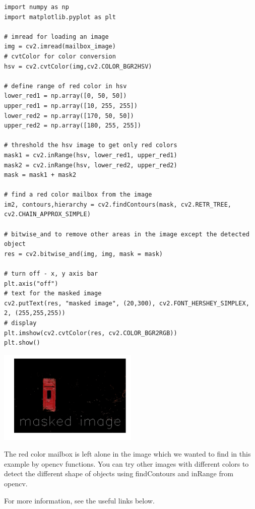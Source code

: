 \begin{lstlisting}
import numpy as np
import matplotlib.pyplot as plt

# imread for loading an image
img = cv2.imread(mailbox_image)
# cvtColor for color conversion
hsv = cv2.cvtColor(img,cv2.COLOR_BGR2HSV)

# define range of red color in hsv
lower_red1 = np.array([0, 50, 50])
upper_red1 = np.array([10, 255, 255])
lower_red2 = np.array([170, 50, 50])
upper_red2 = np.array([180, 255, 255])

# threshold the hsv image to get only red colors
mask1 = cv2.inRange(hsv, lower_red1, upper_red1)
mask2 = cv2.inRange(hsv, lower_red2, upper_red2)
mask = mask1 + mask2

# find a red color mailbox from the image
im2, contours,hierarchy = cv2.findContours(mask, cv2.RETR_TREE, cv2.CHAIN_APPROX_SIMPLE)

# bitwise_and to remove other areas in the image except the detected object
res = cv2.bitwise_and(img, img, mask = mask)

# turn off - x, y axis bar
plt.axis("off")
# text for the masked image
cv2.putText(res, "masked image", (20,300), cv2.FONT_HERSHEY_SIMPLEX, 2, (255,255,255))
# display
plt.imshow(cv2.cvtColor(res, cv2.COLOR_BGR2RGB))
plt.show()
\end{lstlisting}

\includegraphics[width=0.5\textwidth]{facedetection_files/facedetection_49_0.png}

The red color mailbox is left alone in the image which we wanted to find
in this example by opencv functions. You can try other images with
different colors to detect the different shape of objects using
findContours and inRange from opencv.

For more information, see the useful links below.

